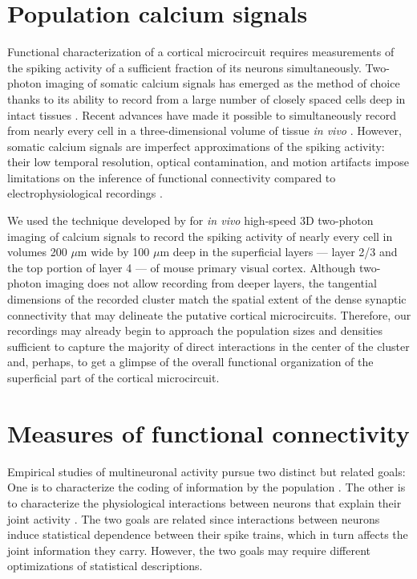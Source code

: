 \section{Population calcium signals}
Functional characterization of a cortical microcircuit requires measurements of the spiking activity of a sufficient fraction of its neurons simultaneously. 
Two-photon imaging of somatic calcium signals has emerged as the method of choice thanks to its ability to record from a large number of closely spaced cells deep in intact tissues \citep{Stosiek:2003,Ko:2011,Ko:2013,Hofer:2011}. 
Recent advances have made it possible to simultaneously record from nearly every cell in a three-dimensional volume of tissue \emph{in vivo} \citep{Reddy:2005, Katona:2012, Cotton:2013}. 
However, somatic calcium signals are imperfect approximations of the spiking activity: their low temporal resolution, optical contamination, and motion artifacts impose limitations on the inference of functional connectivity compared to electrophysiological recordings \citep{Gobel:2007,Grewe:2010,Cotton:2013}.

We used the technique developed by \cite{Cotton:2013} for \emph{in vivo} high-speed 3D two-photon imaging of calcium signals to record the spiking activity of nearly every cell in volumes 200 $\mu$m wide by 100 $\mu$m deep in the superficial layers --- layer 2/3 and the top portion of layer 4 --- of mouse primary visual cortex.
Although two-photon imaging does not allow recording from deeper layers, the tangential dimensions of the recorded cluster match the spatial extent of the dense synaptic connectivity \citep{Song:2005,Fino:2011,Packer:2011,Perin:2011} that may delineate the putative cortical microcircuits. 
Therefore, our recordings may already begin to approach the population sizes and densities sufficient to capture the majority of direct interactions in the center of the cluster and, perhaps, to get a glimpse of the overall functional organization of the superficial part of the cortical microcircuit.

\section{Measures of functional connectivity}
Empirical studies of multineuronal activity pursue two distinct but related goals: 
One is to characterize the coding of information by the population  \citep{Zohary:1994,Averbeck:2006,Ecker:2011,Pillow:2011}. 
The other is to characterize the physiological interactions between neurons that explain their joint activity \citep{Gerstein:1969,Feldt:2011,Denman:2013}.
The two goals are related since interactions between neurons induce statistical dependence between their spike trains, which in turn affects the joint information they carry. 
However, the two goals may require different optimizations of statistical descriptions. 


